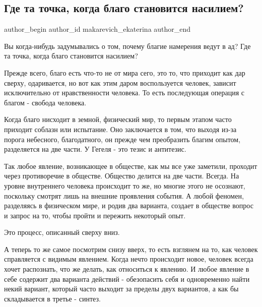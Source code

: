  
 
 
 
 
 
\subsection{Где та точка, когда благо становится насилием?}
\label{sec:08_11_2021.fb.makarevich_ekaterina.1.tochka_blago_nasilie}
 
\ifcmt
 author_begin
   author_id makarevich_ekaterina
 author_end
\fi

Вы когда-нибудь задумывались о том, почему благие намерения ведут в ад? Где та
точка, когда благо становится насилием? 

Прежде всего, благо есть что-то не от мира сего, это то, что приходит как дар
сверху, одаривается, но вот как этим даром воспользуется человек, зависит
исключительно от нравственности человека. То есть последующая операция с благом
- свобода человека. 

Когда благо нисходит в земной, физический мир, то первым этапом часто приходит
соблазн или испытание. Оно заключается в том, что выходя из-за порога
небесного, благодатного, он прежде чем преобразить благим опытом, разделяется
на две части. У Гегеля - это тезис и антитезис. 

Так любое явление, возникающее в обществе, как мы все уже заметили, проходит
через противоречие в обществе. Общество делится на две части. Всегда. На уровне
внутреннего человека происходит то же, но многие этого не осознают, поскольку
смотрят лишь на внешние проявления события. А любой феномен, разделяясь в
физическом мире, и родив два варианта, создает в обществе вопрос и запрос на
то, чтобы пройти и пережить некоторый опыт. 

Это процесс, описанный сверху вниз. 

А теперь то же самое посмотрим снизу вверх, то есть взглянем на то, как человек
справляется с видимым явлением. Когда нечто происходит новое, человек всегда
хочет распознать, что же делать, как относиться к явлению. И любое явление в
себе содержит два варианта действий - обезопасить себя и одновременно найти
некий вариант, который часто выходит за пределы двух вариантов, а как бы
складывается в третье - синтез. 

